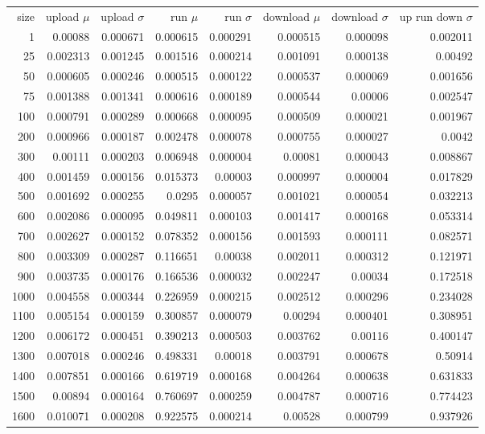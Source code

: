 \begin{longtable}{r r r r r r r r}
size & upload $\mu$  & upload $\sigma$ & run $\mu$ & run $\sigma$ & download $\mu$ & download $\sigma$ & up run down $\sigma$ \\
1 & 0.00088 & 0.000671 & 0.000615 & 0.000291 & 0.000515 & 0.000098 & 0.002011 \\
25 & 0.002313 & 0.001245 & 0.001516 & 0.000214 & 0.001091 & 0.000138 & 0.00492 \\
50 & 0.000605 & 0.000246 & 0.000515 & 0.000122 & 0.000537 & 0.000069 & 0.001656 \\
75 & 0.001388 & 0.001341 & 0.000616 & 0.000189 & 0.000544 & 0.00006 & 0.002547 \\
100 & 0.000791 & 0.000289 & 0.000668 & 0.000095 & 0.000509 & 0.000021 & 0.001967 \\
200 & 0.000966 & 0.000187 & 0.002478 & 0.000078 & 0.000755 & 0.000027 & 0.0042 \\
300 & 0.00111 & 0.000203 & 0.006948 & 0.000004 & 0.00081 & 0.000043 & 0.008867 \\
400 & 0.001459 & 0.000156 & 0.015373 & 0.00003 & 0.000997 & 0.000004 & 0.017829 \\
500 & 0.001692 & 0.000255 & 0.0295 & 0.000057 & 0.001021 & 0.000054 & 0.032213 \\
600 & 0.002086 & 0.000095 & 0.049811 & 0.000103 & 0.001417 & 0.000168 & 0.053314 \\
700 & 0.002627 & 0.000152 & 0.078352 & 0.000156 & 0.001593 & 0.000111 & 0.082571 \\
800 & 0.003309 & 0.000287 & 0.116651 & 0.00038 & 0.002011 & 0.000312 & 0.121971 \\
900 & 0.003735 & 0.000176 & 0.166536 & 0.000032 & 0.002247 & 0.00034 & 0.172518 \\
1000 & 0.004558 & 0.000344 & 0.226959 & 0.000215 & 0.002512 & 0.000296 & 0.234028 \\
1100 & 0.005154 & 0.000159 & 0.300857 & 0.000079 & 0.00294 & 0.000401 & 0.308951 \\
1200 & 0.006172 & 0.000451 & 0.390213 & 0.000503 & 0.003762 & 0.00116 & 0.400147 \\
1300 & 0.007018 & 0.000246 & 0.498331 & 0.00018 & 0.003791 & 0.000678 & 0.50914 \\
1400 & 0.007851 & 0.000166 & 0.619719 & 0.000168 & 0.004264 & 0.000638 & 0.631833 \\
1500 & 0.00894 & 0.000164 & 0.760697 & 0.000259 & 0.004787 & 0.000716 & 0.774423 \\
1600 & 0.010071 & 0.000208 & 0.922575 & 0.000214 & 0.00528 & 0.000799 & 0.937926 \\

\end{longtable}
